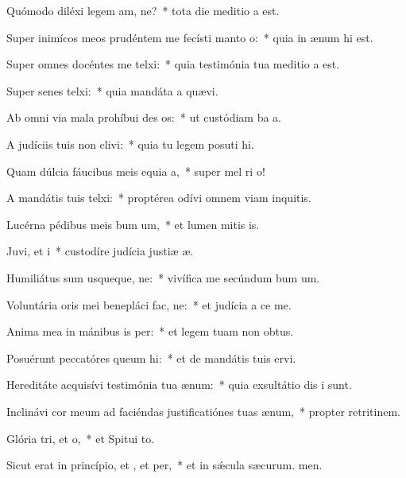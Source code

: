 \item Quómodo diléxi legem am, ne?~* tota die meditio a est.
\item Super inimícos meos prudéntem me fecísti manto o:~* quia in ænum hi est.
\item Super omnes docéntes me telxi:~* quia testimónia tua meditio a est.
\item Super senes telxi:~* quia mandáta a quævi.
\item Ab omni via mala prohíbui des os:~* ut custódiam ba a.
\item A judíciis tuis non clivi:~* quia tu legem posuti hi.
\item Quam dúlcia fáucibus meis equia a,~* super mel ri o!
\item A mandátis tuis telxi:~* proptérea odívi omnem viam inquitis.
\item Lucérna pédibus meis bum um,~* et lumen mitis is.
\item Juvi, et i~* custodíre judícia justiæ æ.
\item Humiliátus sum usqueque, ne:~* vivífica me secúndum bum um.
\item Voluntária oris mei benepláci fac, ne:~* et judícia a ce me.
\item Anima mea in mánibus is per:~* et legem tuam non  obtus.
\item Posuérunt peccatóres queum hi:~* et de mandátis tuis  ervi.
\item Hereditáte acquisívi testimónia tua  ænum:~* quia exsultátio dis i sunt.
\item Inclinávi cor meum ad faciéndas justificatiónes tuas  ænum,~* propter retritinem.
\item Glória tri, et o,~* et Spitui to.
\item Sicut erat in princípio, et , et per,~* et in sǽcula sæcurum. men.
